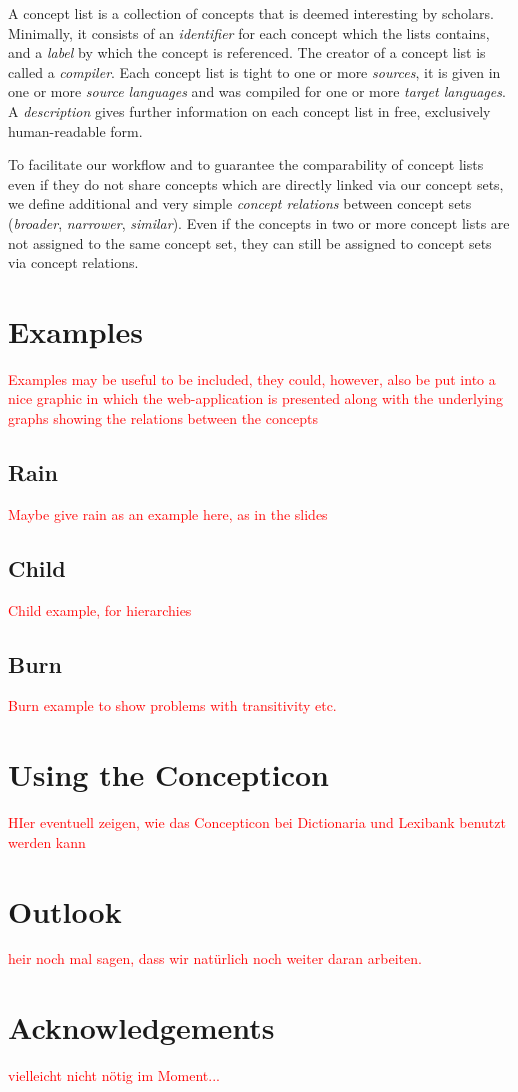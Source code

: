 \documentclass[10pt, a4paper]{article}
\begin{document}
A concept list is a collection of concepts that is deemed interesting by scholars. Minimally, it
consists of an \emph{identifier} for each concept which the lists contains, and a \emph{label} by
which the concept is referenced. The creator of a concept list is called a \emph{compiler}. Each
concept list is tight to one or more \emph{sources}, it is given in one or more \emph{source
languages} and was compiled for one or more \emph{target languages}. A \emph{description} gives
further information on each concept list in free, exclusively human-readable form.
 
To facilitate our workflow and to guarantee the comparability of concept lists even if they do not
share concepts which are directly linked via our concept sets, we define additional and very simple
\emph{concept relations} between concept sets (\emph{broader}, \emph{narrower}, \emph{similar}).
Even if the concepts in two or more concept lists are not assigned to the same concept set, they can
still be assigned to concept sets via concept relations.

\section{Examples}
\textcolor{red}{Examples may be useful to be included, they could, however, also be put into a nice
graphic in which the web-application is presented along with the underlying graphs showing the
relations between the concepts}
\subsection{Rain}

\textcolor{red}{Maybe give rain as an example here, as in the slides}

\subsection{Child}

\textcolor{red}{Child example, for hierarchies}

\subsection{Burn}
\textcolor{red}{Burn example to show problems with transitivity etc.}

\section{Using the Concepticon}
\textcolor{red}{HIer eventuell zeigen, wie das Concepticon bei Dictionaria und Lexibank benutzt
werden kann}

\section{Outlook}
\textcolor{red}{heir noch mal sagen, dass wir natürlich noch weiter daran arbeiten.}


\section{Acknowledgements}
\textcolor{red}{vielleicht nicht nötig im Moment...}



\end{document}
